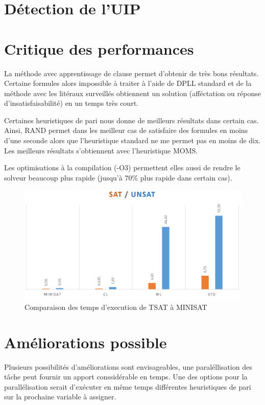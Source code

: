 \documentclass{article}
\begin{document}
\section{Détection de l'UIP}

\section{Critique des performances}
La méthode avec apprentissage de clause permet d'obtenir de très bons résultats. Certaine formules alors impossible à traiter à l'aide de DPLL standard et de la méthode avec les litéraux surveillés obtiennent un solution (afféctation ou réponse d'insatisfaisabilité) en un temps très court.

Certaines heuristiques de pari nous donne de meilleurs résultats dans certain cas. Ainsi, RAND permet dans les meilleur cas de satisfaire des formules en moins d'une seconde alors que l'heuristique standard ne me permet pas en moins de dix. Les meilleurs résultats s'obtiennent avec l'heuristique MOMS.

Les optimisations à la compilation (-O3) permettent elles aussi de rendre le solveur beaucoup plus rapide (jusqu'à 70\% plus rapide dans certain cas).
\\
\begin{figure}[h]
    \begin{center}
        \includegraphics[scale=0.25]{time.png}
    \end{center}
    \caption{Comparaison des temps d'execution de TSAT à MINISAT}
    \label{Comparaisons}
\end{figure}

\section{Améliorations possible}
Plusieurs possibilités d'améliorations sont envisageables, une paraléllisation des tâche peut fournir un apport conssidérable en temps. Une des options pour la parallélisation serait d'exécuter en même temps différentes heuristiques de pari sur la prochaine variable à assigner.



\end{document}
